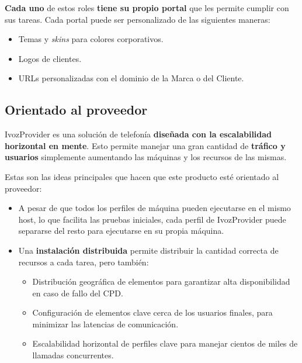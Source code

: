 \documentclass[letterpaper,10pt,spanish]{sphinxmanual}
\begin{document}
\textbf{Cada uno} de estos roles \textbf{tiene su propio portal} que les permite cumplir con sus tareas. Cada portal puede ser personalizado de las siguientes maneras:
\begin{itemize}
\item {} 
Temas y \emph{skins} para colores corporativos.

\item {} 
Logos de clientes.

\item {} 
URLs personalizadas con el dominio de la Marca o del Cliente.

\end{itemize}


\subsection{Orientado al proveedor}
\label{basic_concepts/intro/what_is_ivozprovider:operator-oriented}\label{basic_concepts/intro/what_is_ivozprovider:provider-oriented}
IvozProvider es una solución de telefonía \textbf{diseñada con la escalabilidad horizontal en mente}. Esto permite manejar una gran cantidad de \textbf{tráfico y usuarios} simplemente aumentando las máquinas y los recursos de las mismas.

Estas son las ideas principales que hacen que este producto esté orientado al proveedor:
\begin{itemize}
\item {} 
A pesar de que todos los perfiles de máquina pueden ejecutarse en el mismo host, lo que facilita las pruebas iniciales, cada perfil de IvozProvider puede separarse del resto para ejecutarse en su propia máquina.

\item {} 
Una \textbf{instalación distribuida} permite distribuir la cantidad correcta de recursos a cada tarea, pero también:
\begin{itemize}
\item {} 
Distribución geográfica de elementos para garantizar alta disponibilidad en caso de fallo del CPD.

\item {} 
Configuración de elementos clave cerca de los usuarios finales, para minimizar las latencias de comunicación.

\item {} 
Escalabilidad horizontal de perfiles clave para manejar cientos de miles de llamadas concurrentes.

\end{itemize}

\end{itemize}
\end{document}
